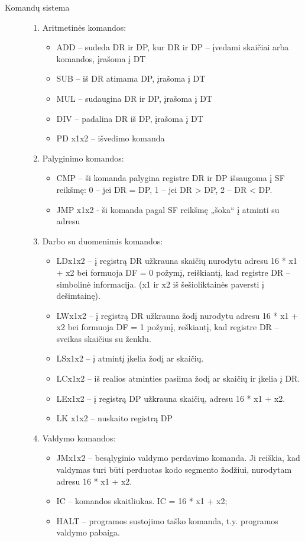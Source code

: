\begin{description}
\item[Komandų sistema] \leavevmode 
\begin{enumerate}
\item Aritmetinės komandos: \leavevmode 
\begin{itemize}
\item ADD – sudeda DR ir DP, kur DR ir DP – įvedami skaičiai arba komandos, įrašoma į DT
\item SUB – iš DR atimama DP, įrašoma į DT
\item MUL – sudaugina DR ir DP, įrašoma į DT
\item DIV – padalina DR iš DP, įrašoma į DT
\item PD x1x2 – išvedimo komanda
\end{itemize}
\item Palyginimo komandos:
\begin{itemize}
\item CMP – ši komanda palygina registre DR ir DP išsaugoma į SF reikšmę: 0 – jei DR = DP,  1 – jei DR > DP, 2 –  DR < DP.
\item JMP x1x2 - ši komanda pagal SF reikšmę „šoka“ į atminti su adresu 
\end{itemize}
\item  Darbo su duomenimis komandos:
\begin{itemize}
\item LDx1x2 – į registrą DR užkrauna skaičių nurodytu adresu 16 * x1 + x2 bei formuoja DF = 0 požymį, reiškiantį, kad registre DR – simbolinė informacija. (x1 ir x2 iš šešioliktainės paversti į dešimtainę). 
\item LWx1x2 – į registrą DR užkrauna žodį nurodytu adresu 16 * x1 + x2 bei formuoja DF = 1 požymį, reškiantį, kad registre DR – sveikas skaičius su ženklu.
\item LSx1x2 – į atmintį įkelia žodį ar skaičių.
\item LCx1x2 – iš realios atminties pasiima žodį ar skaičių ir įkelia į DR.
\item LEx1x2 – į registrą DP užkrauna skaičių, adresu 16 * x1 + x2.
\item LK x1x2 – nuskaito registrą DP
\end{itemize}
\item Valdymo komandos:
\begin{itemize}
\item JMx1x2 – besąlyginio valdymo perdavimo komanda. Ji reiškia, kad valdymas turi būti perduotas kodo segmento žodžiui, nurodytam adresu 16 * x1 + x2.
\item IC – komandos skaitliukas. IC = 16 * x1 + x2;
\item HALT – programos sustojimo taško komanda, t.y. programos valdymo pabaiga.
\end{itemize}
\end{enumerate}
\end{description}   
   
